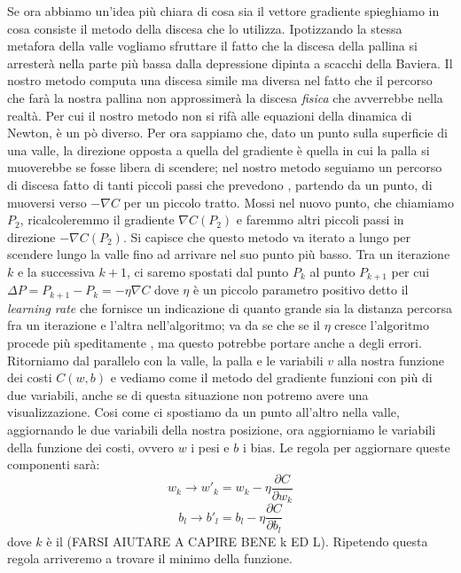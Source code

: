 Se ora abbiamo un'idea più chiara di cosa sia il vettore gradiente spieghiamo in cosa consiste il metodo della discesa che lo utilizza. Ipotizzando la stessa metafora della valle vogliamo sfruttare il fatto che la discesa della pallina si arresterà nella parte più bassa dalla depressione dipinta a scacchi della Baviera. Il nostro metodo computa una discesa simile ma diversa nel fatto che il percorso che farà la nostra pallina non approssimerà la discesa \textit{fisica} che avverrebbe nella realtà. Per cui il nostro metodo non si rifà alle equazioni della dinamica di Newton, è un pò diverso. Per ora sappiamo che, dato un punto sulla superficie di una valle, la direzione opposta a quella del gradiente è quella in cui la palla si muoverebbe se fosse libera di scendere; nel nostro metodo seguiamo un percorso di discesa fatto di tanti piccoli passi che prevedono , partendo da un punto, di muoversi verso $-\nabla C$ per un piccolo tratto. Mossi nel nuovo punto, che chiamiamo $P_{2}$, ricalcoleremmo il gradiente $\nabla C(P_{2})$ e faremmo altri piccoli passi in direzione $- \nabla C(P_{2})$. Si capisce che questo metodo va iterato a lungo per scendere lungo la valle fino ad arrivare nel suo punto più basso. Tra un iterazione $k$ e la successiva $k+1$, ci saremo spostati dal punto $P_{k}$ al punto $P_{k+1}$ per cui $ \Delta P= P_{k+1}-P_{k}=-\eta \nabla C$ dove $\eta$ è un piccolo parametro positivo detto il \textit{learning rate} che fornisce un indicazione di quanto grande sia la distanza percorsa fra un iterazione e l'altra nell'algoritmo; va da se che se il $\eta$ cresce l'algoritmo procede più speditamente , ma questo potrebbe portare anche a degli errori. Ritorniamo dal parallelo con la valle, la palla e le variabili $v$ alla nostra funzione dei costi $C(w, b)$ e vediamo come il metodo del gradiente funzioni con più di due variabili, anche se di questa situazione non potremo avere una visualizzazione. Cosi come ci spostiamo da un punto all'altro nella valle, aggiornando le due variabili della nostra posizione, ora aggiorniamo le variabili della funzione dei costi, ovvero $w$ i pesi e $b$ i bias. Le regola per aggiornare queste componenti sarà:
\begin{equation}
w_{k}\rightarrow w'_{k}=w_{k}-\eta \dfrac{\partial C}{\partial w_{k}}
\end{equation}
\begin{equation}
b_{l}\rightarrow b'_{l}=b_{l}-\eta \dfrac{\partial C}{\partial b_{l}}
\end{equation}
dove $k$ è il (FARSI AIUTARE A CAPIRE BENE k ED L). Ripetendo questa regola arriveremo a trovare il minimo della funzione.
